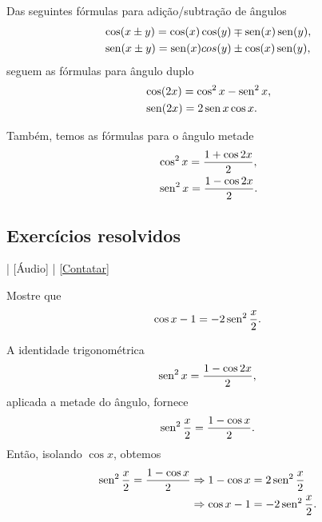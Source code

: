 Das seguintes fórmulas para adição/subtração de ângulos
\begin{align}
  &\cos(x\pm y) = \cos(x)\cos(y) \mp \operatorname{sen}(x)\operatorname{sen}(y),\\
  &\operatorname{sen}(x\pm y) = \operatorname{sen}(x)cos(y) \pm \cos(x)\operatorname{sen}(y),
\end{align}
seguem as fórmulas para ângulo duplo
\begin{align}
  &\cos(2x) = \cos^2x - \operatorname{sen}^2x,\\
  &\operatorname{sen}(2x) = 2\operatorname{sen} x\cos x.
\end{align}

Também, temos as fórmulas para o ângulo metade
\begin{align}
  &\cos^2 x = \frac{1 + \cos 2x}{2},\\
  &\operatorname{sen}^2 x = \frac{1 - \cos 2x}{2}.\label{eq:id_trig_cos_x2}
\end{align}

\subsection*{Exercícios resolvidos}

\begin{flushright}
  [Vídeo] | [Áudio] | \href{https://phkonzen.github.io/notas/contato.html}{[Contatar]}
\end{flushright}

\begin{exeresol}
  Mostre que
  \begin{equation}
    \cos x - 1 = -2\operatorname{sen}^2 \frac{x}{2}.
  \end{equation}
\end{exeresol}
\begin{resol}
  A identidade trigonométrica
  \begin{equation}
    \operatorname{sen}^2 x = \frac{1 - \cos 2x}{2},
  \end{equation}
  aplicada a metade do ângulo, fornece
  \begin{equation}
    \operatorname{sen}^2 \frac{x}{2} = \frac{1 - \cos x}{2}.
  \end{equation}
  Então, isolando $\cos x$, obtemos
  \begin{align}
    \operatorname{sen}^2 \frac{x}{2} = \frac{1 - \cos x}{2} &\Rightarrow 1 - \cos x = 2\operatorname{sen}^2 \frac{x}{2}\\
                                              &\Rightarrow \cos x - 1 = -2\operatorname{sen}^2 \frac{x}{2}.
  \end{align}
\end{resol}

